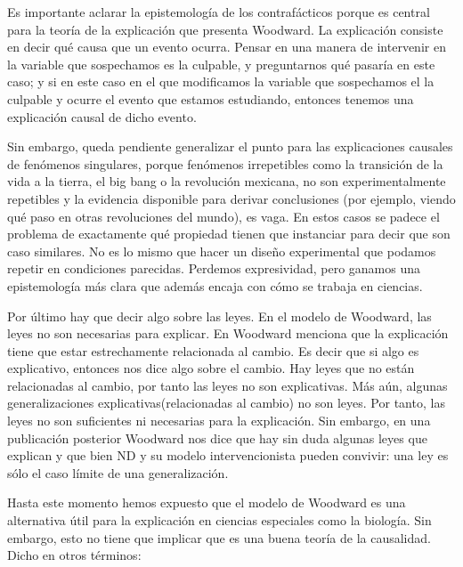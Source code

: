 {Es importante aclarar la epistemología de los contrafácticos porque es central para la teoría de la explicación que presenta Woodward. La explicación consiste en decir qué causa que un evento ocurra. Pensar en una manera de intervenir en la variable que sospechamos es la culpable, y preguntarnos qué pasaría en este caso; y si en este caso en el que modificamos la variable que sospechamos el la culpable y ocurre el evento que estamos estudiando, entonces tenemos una explicación causal de dicho evento.

Sin embargo, queda pendiente generalizar el punto para las explicaciones causales de fenómenos singulares, porque fenómenos irrepetibles como la transición de la vida a la tierra, el big bang o la revolución mexicana, no son experimentalmente repetibles y la evidencia disponible para derivar conclusiones (por ejemplo, viendo qué paso en otras revoluciones del mundo), es vaga. En estos casos se padece el problema de exactamente qué propiedad tienen que instanciar para decir que son caso similares. No es lo mismo que hacer un diseño experimental que podamos repetir en condiciones parecidas. Perdemos expresividad, pero ganamos una epistemología más clara que además encaja con cómo se trabaja en ciencias.

Por último hay que decir algo sobre las leyes. En el modelo de Woodward, las leyes no son necesarias para explicar. En \cite{Woodward2000} Woodward menciona que la explicación tiene que estar estrechamente relacionada al cambio. Es decir que si algo es explicativo, entonces nos dice algo sobre el cambio. Hay leyes que no están relacionadas al cambio, por tanto las leyes no son explicativas. Más aún, algunas generalizaciones explicativas(relacionadas al cambio) no son leyes. Por tanto, las leyes no son suficientes ni necesarias para la explicación. Sin embargo, en una publicación posterior \citeyear{Woodward2003} Woodward nos dice que hay sin duda algunas leyes que explican y que bien ND y su modelo intervencionista pueden convivir: una ley es sólo el caso límite de una generalización.

Hasta este momento hemos expuesto que el modelo de Woodward es una alternativa útil para la explicación en ciencias especiales como la biología. Sin embargo, esto no tiene que implicar que es una buena teoría de la causalidad. Dicho en otros términos:

}
